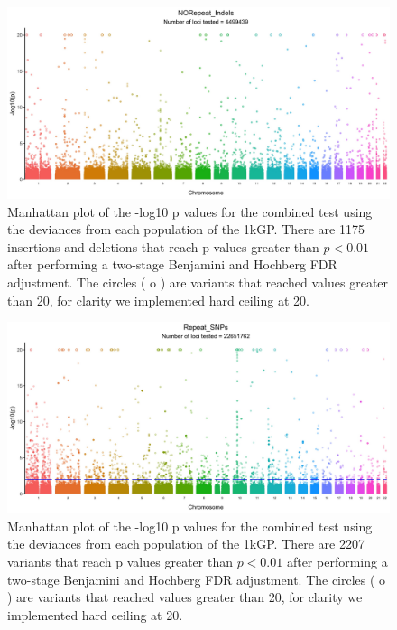 \documentclass[9pt,lineno]{elife}
\begin{document}
\begin{figure}[h]
\includegraphics[width=\hsize,keepaspectratio]{./Figures/ManhattanPlot_NORepeat_Indels.jpg}

\caption{Manhattan plot of the -log10 p values for the combined test using the deviances from each population of the 1kGP. 
There are 1175 insertions and deletions that reach p values greater than $ p < 0.01$ after performing a two-stage Benjamini and Hochberg FDR adjustment. 
The circles ( o ) are variants that reached values greater than 20, for clarity we implemented hard ceiling at 20.}
 \label{NRI_Manhattan}
\end{figure}

\begin{figure}[h]
\includegraphics[width=\hsize,keepaspectratio]{./Figures/ManhattanPlot_Repeat_SNPs.jpg}

\caption{Manhattan plot of the -log10 p values for the combined test using the deviances from each population of the 1kGP. 
There are 2207 variants that reach p values greater than $ p < 0.01$ after performing a two-stage Benjamini and Hochberg FDR adjustment. 
The circles ( o ) are variants that reached values greater than 20, for clarity we implemented hard ceiling at 20.}
\label{RS_Manhattan}
\end{figure}
\end{document}
